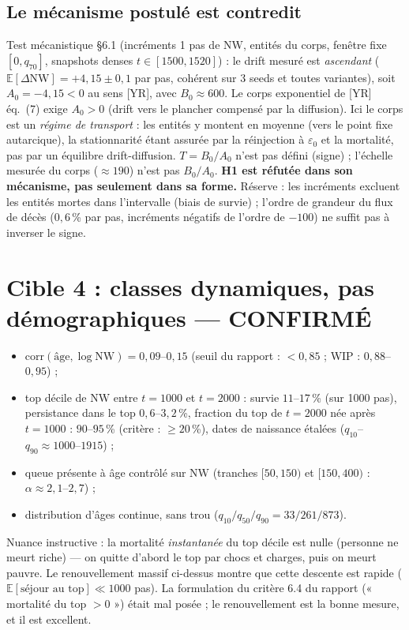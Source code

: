 \documentclass[11pt,a4paper]{article}
\newcommand{\NW}{\mathrm{NW}}
\newcommand{\E}{\mathbb{E}}
\begin{document}
\subsection{Le mécanisme postulé est contredit}
Test mécanistique §6.1 (incréments 1 pas de $\NW$, entités du corps,
fenêtre fixe $[0, q_{70}]$, snapshots denses $t \in [1500, 1520]$) :
le drift mesuré est \emph{ascendant} ($\E[\Delta\NW] = +4{,}15 \pm 0{,}1$
par pas, cohérent sur 3 seeds et toutes variantes), soit $A_0 = -4{,}15 < 0$
au sens [YR], avec $B_0 \approx 600$. Le corps exponentiel de [YR] éq.~(7)
exige $A_0 > 0$ (drift vers le plancher compensé par la diffusion). Ici le
corps est un \emph{régime de transport} : les entités y montent en moyenne
(vers le point fixe autarcique), la stationnarité étant assurée par la
réinjection à $\varepsilon_0$ et la mortalité, pas par un équilibre
drift-diffusion. $T = B_0/A_0$ n'est pas défini (signe) ; l'échelle mesurée
du corps ($\approx 190$) n'est pas $B_0/A_0$. \textbf{H1 est réfutée dans son
mécanisme, pas seulement dans sa forme.} Réserve : les incréments excluent
les entités mortes dans l'intervalle (biais de survie) ; l'ordre de grandeur
du flux de décès ($0{,}6$\,\% par pas, incréments négatifs de l'ordre de
$-100$) ne suffit pas à inverser le signe.

\section{Cible 4 : classes dynamiques, pas démographiques — CONFIRMÉ}

\begin{itemize}[nosep]
\item $\mathrm{corr}(\text{âge}, \log \NW) = 0{,}09$--$0{,}15$ (seuil du
  rapport : $< 0{,}85$ ; WIP : $0{,}88$--$0{,}95$) ;
\item top décile de $\NW$ entre $t=1000$ et $t=2000$ : survie
  $11$--$17$\,\% (sur 1000 pas), persistance dans le top $0{,}6$--$3{,}2$\,\%,
  fraction du top de $t=2000$ née après $t=1000$ : $90$--$95$\,\%
  (critère : $\ge 20$\,\%), dates de naissance étalées
  ($q_{10}$--$q_{90} \approx 1000$--$1915$) ;
\item queue présente à âge contrôlé sur $\NW$ (tranches $[50,150)$ et
  $[150,400)$ : $\alpha \approx 2{,}1$--$2{,}7$) ;
\item distribution d'âges continue, sans trou ($q_{10}/q_{50}/q_{90}
  = 33/261/873$).
\end{itemize}

Nuance instructive : la mortalité \emph{instantanée} du top décile est
nulle (personne ne meurt riche) — on quitte d'abord le top par chocs et
charges, puis on meurt pauvre. Le renouvellement massif ci-dessus montre que
cette descente est rapide ($\E[\text{séjour au top}] \ll 1000$ pas). La
formulation du critère 6.4 du rapport (« mortalité du top $> 0$ ») était
mal posée ; le renouvellement est la bonne mesure, et il est excellent.
\end{document}
